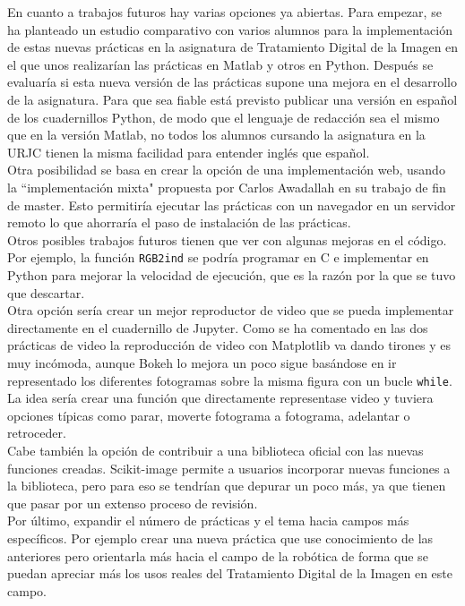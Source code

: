 En cuanto a trabajos futuros hay varias opciones ya abiertas. Para empezar, se ha planteado un estudio comparativo con varios alumnos para la implementación de estas nuevas prácticas en la asignatura de Tratamiento Digital de la Imagen  en el que unos realizarían las prácticas en Matlab y otros en Python. Después se evaluaría si esta nueva versión de las prácticas supone una mejora en el desarrollo de la asignatura. Para que sea fiable está previsto publicar una versión en español de los cuadernillos Python, de modo que el lenguaje de redacción sea el mismo que en la versión Matlab, no todos los alumnos cursando la asignatura en la URJC tienen la misma facilidad para entender inglés que español.\\

Otra posibilidad se basa en crear la opción de una implementación web, usando la ``implementación mixta" propuesta por Carlos Awadallah en su trabajo de fin de master\cite{mastersthesis}. Esto permitiría ejecutar las prácticas con un navegador en un servidor remoto lo que ahorraría el paso de instalación de las prácticas.\\

Otros posibles trabajos futuros tienen que ver con algunas mejoras en el código. Por ejemplo, la función \texttt{RGB2ind} se podría programar en C e implementar en Python para mejorar la velocidad de ejecución, que es la razón por la que se tuvo que descartar.\\

Otra opción sería crear un mejor reproductor de video que se pueda implementar directamente en el cuadernillo de Jupyter. Como se ha comentado en las dos prácticas de video la reproducción de video con Matplotlib va dando tirones y es muy incómoda, aunque Bokeh lo mejora un poco sigue basándose en ir representado los diferentes fotogramas sobre la misma figura con un bucle \texttt{while}. La idea sería crear una función que directamente representase video y tuviera opciones típicas como parar, moverte fotograma a fotograma, adelantar o retroceder.\\

Cabe también la opción de contribuir a una biblioteca oficial con las nuevas funciones creadas. Scikit-image permite a usuarios incorporar nuevas funciones a la biblioteca, pero para eso se tendrían que depurar un poco más, ya que tienen que pasar por un extenso proceso de revisión.\\

Por último, expandir el número de prácticas y el tema hacia campos más específicos. Por ejemplo crear una nueva práctica que use conocimiento de las anteriores pero orientarla más hacia el campo de la robótica de forma que se puedan apreciar más los usos reales del Tratamiento Digital de la Imagen en este campo.\\